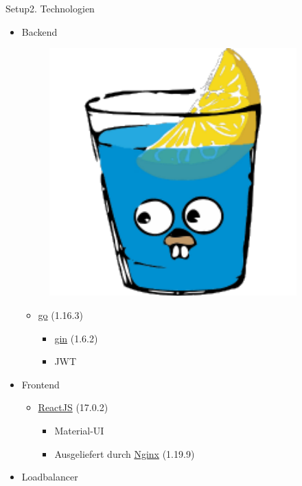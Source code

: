\documentclass[aspectratio=169,20pt]{beamer}
\begin{document}
\begin{frame}{Setup}{2. Technologien}
	\begin{itemize}
		\item{Backend}
		\begin{figure}
\includegraphics[width=0.9\textwidth]{gin} 
\end{figure}
		\begin{itemize}
			\item{\href{https://golang.org/}{go} (1.16.3)}
			\begin{itemize}
				\item{\href{https://gin-gonic.com/}{gin} (1.6.2)}
				\item{JWT}
			\end{itemize}
		\end{itemize}
		\item{Frontend}
		\begin{itemize}
			\item{\href{https://reactjs.org/versions/}{ReactJS} (17.0.2)}
			\begin{itemize}
				\item{Material-UI}
				\item{Ausgeliefert durch \href{https://nginx.org/}{Nginx} (1.19.9)}
			\end{itemize}
		\end{itemize}
		\item{Loadbalancer}
		       

\end{itemize}
\end{frame}
\end{document}

